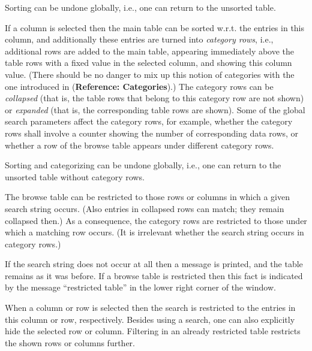 \documentclass[a4paper,11pt]{report}
\begin{document}
{{\begin{description}
 Sorting can be undone globally, i.{\nobreakspace}e., one can return to the
unsorted table. 
\item[{Sorting and Categorizing:\index{categorizing a browse table} }]  If a column is selected then the main table can be sorted w.r.t. the entries
in this column, and additionally these entries are turned into \emph{category rows}, i.{\nobreakspace}e., additional rows are added to the main table, appearing
immediately above the table rows with a fixed value in the selected column,
and showing this column value. (There should be no danger to mix up this
notion of categories with the one introduced in{\nobreakspace} (\textbf{Reference: Categories}).) The category rows can be \emph{collapsed}  (that is, the table rows that belong to this category row are not shown) or \emph{expanded} (that is, the corresponding table rows are shown). Some of the global search
parameters affect the category rows, for example, whether the category rows
shall involve a counter showing the number of corresponding data rows, or
whether a row of the browse table appears under different category rows. 

  Sorting and categorizing can be undone globally, i.{\nobreakspace}e., one can
return to the unsorted table without category rows. 
\item[{Filtering:\index{filtering a browse table} }]  The browse table can be restricted to those rows or columns in which a given
search string occurs. (Also entries in collapsed rows can match; they remain
collapsed then.) As a consequence, the category rows are restricted to those
under which a matching row occurs. (It is irrelevant whether the search string
occurs in category rows.) 

 If the search string does not occur at all then a message is printed, and the
table remains as it was before. If a browse table is restricted then this fact
is indicated by the message ``restricted table'' in the lower right corner of the window. 

 When a column or row is selected then the search is restricted to the entries
in this column or row, respectively. Besides using a search, one can also
explicitly hide the selected row or column. Filtering in an already restricted
table restricts the shown rows or columns further. 


\end{description}}}
\end{document}
